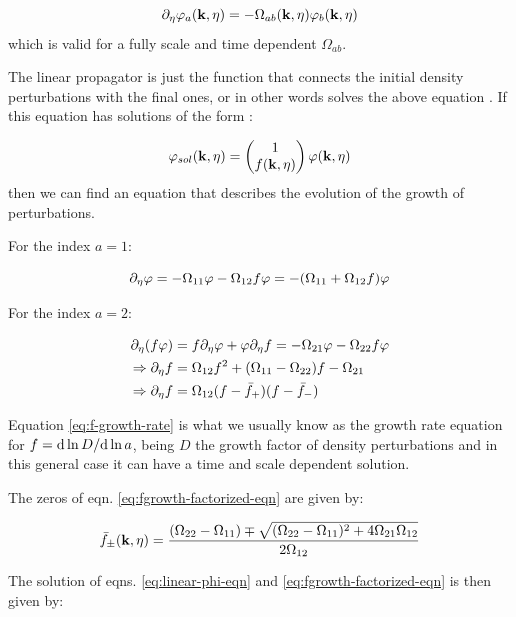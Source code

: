 \begin{equation}
\partial_{\eta}\varphi_{a}(\mathbf{k},\eta)=-\Omega_{ab}(\mathbf{k},\eta)\varphi_{b}(\mathbf{k},\eta)\label{eq:2.1}
\end{equation}
which is valid for a fully scale and time dependent $\Omega_{ab}$.

The linear propagator is just the function that connects the initial
density perturbations with the final ones, or in other words solves
the above equation \cite{crocce_renormalized_2005}. If this equation
has solutions of the form \cite{pietroni_flowing_2008}:

\[
\varphi_{sol}(\mathbf{k},\eta)=\begin{pmatrix}1\\
f(\mathbf{k},\eta)
\end{pmatrix}\varphi(\mathbf{k},\eta)
\]
then we can find an equation that describes the evolution of the growth
of perturbations.

For the index $a=1$:

\begin{equation}
\partial_{\eta}\varphi=-\Omega_{11}\varphi-\Omega_{12}f\varphi=-(\Omega_{11}+\Omega_{12}f)\varphi\label{eq:linear-phi-eqn}
\end{equation}


For the index $a=2$:

\begin{align}
\partial_{\eta}(f\varphi) & =f\partial_{\eta}\varphi+\varphi\partial_{\eta} f=-\Omega_{21}\varphi-\Omega_{22}f\varphi\nonumber \\
\Rightarrow\partial_{\eta} f & =\Omega_{12}f^{2}+(\Omega_{11}-\Omega_{22})f-\Omega_{21}\label{eq:f-growth-rate}\\
\Rightarrow\partial_{\eta} f & =\Omega_{12}(f-\bar{f}_{+})(f-\bar{f}_{-})\label{eq:fgrowth-factorized-eqn}
\end{align}


Equation \ref{eq:f-growth-rate} is what we usually know as the growth
rate equation for $f=\mathrm{d}\ln D/\mathrm{d}\ln a$, being $D$ the growth factor
of density perturbations and in this general case it can have a time
and scale dependent solution.

The zeros of eqn. \ref{eq:fgrowth-factorized-eqn} are given by:

\begin{equation}
\bar{f}_{\pm}(\mathbf{k},\eta)=\frac{(\Omega_{22}-\Omega_{11})\mp\sqrt{(\Omega_{22}-\Omega_{11})^{2}+4\Omega_{21}\Omega_{12}}}{2\Omega_{12}}\label{eq:2.4}
\end{equation}


The solution of eqns. \ref{eq:linear-phi-eqn} and \ref{eq:fgrowth-factorized-eqn}
is then given by:

